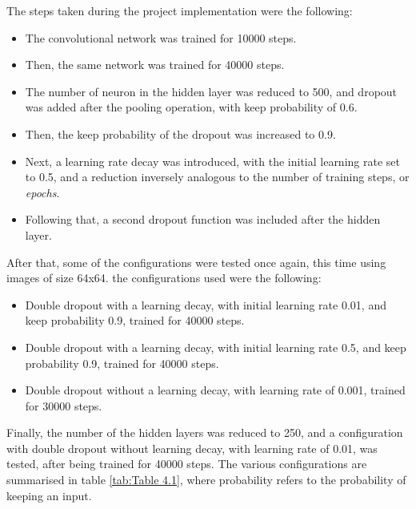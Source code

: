 \documentclass[final,12p,times]{elsarticle}
\begin{document}
The steps taken during the project implementation were the following:

\begin{itemize}
\item The convolutional network was trained for 10000 steps.
\item Then, the same network was trained for 40000 steps.
\item The number of neuron in the hidden layer was reduced to 500, and dropout was added after the pooling operation, with keep probability of 0.6.
\item Then, the keep probability of the dropout was increased to 0.9.
\item Next, a learning rate decay was introduced, with the initial learning rate set to 0.5, and a reduction inversely analogous to the number of training steps, or \emph{epochs}.
\item Following that, a second dropout function was included after the hidden layer.
\end {itemize}


After that, some of the configurations were tested once again, this time using images of size 64x64.
the configurations used were the following:

\begin{itemize}
\item Double dropout with a learning decay, with initial learning rate 0.01, and keep probability 0.9, trained for 40000 steps.
\item Double dropout with a learning decay, with initial learning rate 0.5, and keep probability 0.9, trained for 40000 steps.
\item Double dropout without a learning decay, with learning rate  of 0.001, trained for 30000 steps.
\end {itemize}

Finally, the number of the hidden layers was reduced to 250, and a configuration with double dropout without learning decay, 
with learning rate of 0.01, was tested, after being trained for 40000 steps.
The various configurations are summarised in table \ref{tab:Table 4.1}, where probability refers to the probability of keeping an input.
\end{document}
